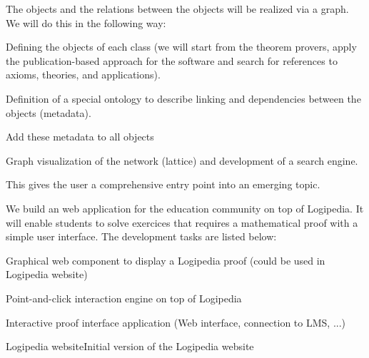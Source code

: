 \begin{workpackage}[id=dissemination,type=MGT,
  short={Dissemination},
  title={Dissemination, communication and exploitation},
  lead=Inr,InrRM=12,BirRM=4,IrtRM=4,ImtRM=2,StrRM=2,ZibRM=14,EduRM=12]
\begin{tasklist}
\begin{task}[id=zib,
      title=Linking scientific publications to Logipedia,
      lead=Zib,ZibRM=12,wphases=12-23]
    The objects and the relations between the objects will be
    realized via a graph. We will do this in the following way:
    \begin{compactitem}
    \item Defining the objects of each class (we will start from the
      theorem provers, apply the publication-based approach for the
      software and search for references to axioms, theories, and
      applications).
    \item Definition of a special ontology to describe linking and
      dependencies between the objects (metadata).
    \item Add these metadata to all objects
    \item Graph visualization of the network (lattice) and development
      of a search engine.
    \end{compactitem}
    This gives the user a comprehensive entry point into an emerging
    topic.
  \end{task}

  \begin{task}[id=edukera,
      title=Web interface for doing proofs at school,
      lead=Edu,EduRM=12,wphases=12-24]
    We build an web application for the education community on top of Logipedia. It will
    enable students to solve exercices that requires a mathematical proof with a simple
    user interface.
    The development tasks are listed below:
    \begin{compactitem}
    \item Graphical web component to display a Logipedia proof (could be used in Logipedia website)
    \item Point-and-click interaction engine on top of Logipedia
    \item Interactive proof interface application (Web interface, connection to LMS, ...)
    \end{compactitem}
  \end{task}

\end{tasklist}

\begin{wpdelivs}


  \begin{wpdeliv}[due=1,miles=startup,id=requirements,dissem=PU,nature=DEC,lead=Inr]{Logipedia website}Initial version of the Logipedia website
  \end{wpdeliv}


\end{wpdelivs}
\end{workpackage}
